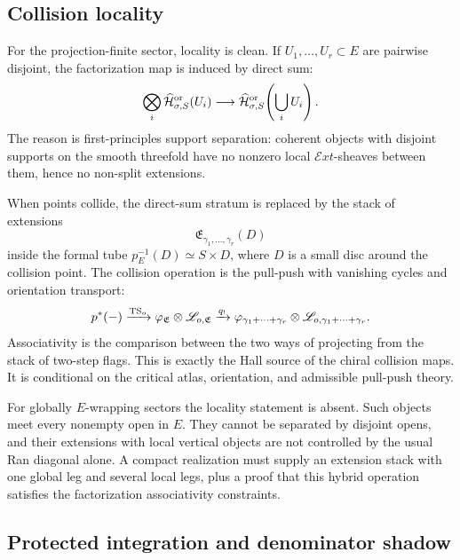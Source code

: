 \subsection{Collision locality}

For the projection-finite sector, locality is clean.  If
\(U_1,\ldots,U_r\subset E\) are pairwise disjoint, the factorization map
is induced by direct sum:
\[
\bigotimes_i
\widehat{\mathcal H}^{\mathrm{or}}_{\sigma,S}(U_i)
\longrightarrow
\widehat{\mathcal H}^{\mathrm{or}}_{\sigma,S}\!\left(\bigcup_iU_i\right).
\]
The reason is first-principles support separation: coherent objects with
disjoint supports on the smooth threefold have no nonzero local
\(\mathcal Ext\)-sheaves between them, hence no non-split extensions.

When points collide, the direct-sum stratum is replaced by the stack of
extensions
\[
\mathfrak E_{\gamma_1,\ldots,\gamma_r}(D)
\]
inside the formal tube \(p_E^{-1}(D)\simeq S\times D\), where \(D\) is a
small disc around the collision point.  The collision operation is the
pull-push with vanishing cycles and orientation transport:
\[
p^*(-)\xrightarrow{\mathrm{TS}_o}
\varphi_{\mathfrak E}\otimes\mathscr L_{o,\mathfrak E}
\xrightarrow{q_!}
\varphi_{\gamma_1+\cdots+\gamma_r}\otimes
\mathscr L_{o,\gamma_1+\cdots+\gamma_r}.
\]
Associativity is the comparison between the two ways of projecting from
the stack of two-step flags.  This is exactly the Hall source of the
chiral collision maps.  It is conditional on the critical atlas,
orientation, and admissible pull-push theory.

For globally \(E\)-wrapping sectors the locality statement is absent.
Such objects meet every nonempty open in \(E\).  They cannot be separated
by disjoint opens, and their extensions with local vertical objects are
not controlled by the usual Ran diagonal alone.  A compact realization
must supply an extension stack with one global leg and several local
legs, plus a proof that this hybrid operation satisfies the factorization
associativity constraints.

\subsection{Protected integration and denominator shadow}

